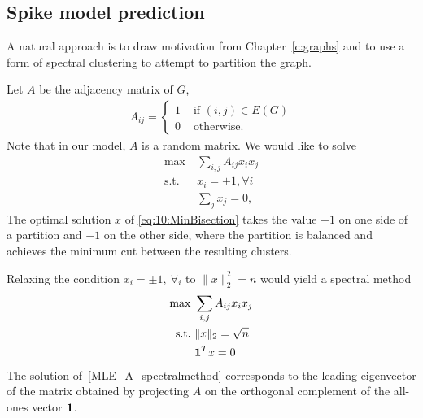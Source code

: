 \subsection{Spike model prediction}

A natural approach is to draw motivation from Chapter~\ref{c:graphs} and to use a form of spectral clustering to attempt to partition the graph.

Let $A$ be the adjacency matrix of $G$,
\begin{align}
A_{ij} = \left\{ \begin{array}{cc} 1 & \text{ if } (i,j)\in E(G) \\ 0 & \text{ otherwise.} \end{array}  \right.
\end{align}
Note that in our model, $A$ is a random matrix.  We would like to solve
\begin{align}
\max\ & \sum_{i,j}A_{ij}x_ix_j \nonumber\\
\text{s.t.}\ &x_i=\pm1, \forall i \label{eq:10:MinBisection}\\
 & \sum_j x_j = 0, \nonumber
\end{align}
The optimal solution $x$ of \eqref{eq:10:MinBisection} takes the value $+1$ on one side of a partition and $-1$ on the other side, where the partition is balanced and achieves the minimum cut between the resulting clusters.

Relaxing the condition $x_i=\pm1,\ \forall_i$ to $\|x\|_2^2=n$ would yield a spectral method
\begin{align}
\max\ & \sum_{i,j}A_{ij}x_ix_j \nonumber\\
\text{s.t.}\ & \|x\|_2 = \sqrt{n} \label{MLE_A_spectralmethod}\\
 & \mathbf{1}^T x = 0 \nonumber
\end{align}
The solution of~\eqref{MLE_A_spectralmethod} corresponds to the leading eigenvector of the matrix obtained by projecting $A$ on the orthogonal complement of the all-ones vector $\mathbf{1}$.

